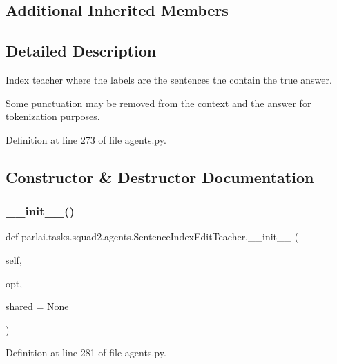 \subsection*{Additional Inherited Members}


\subsection{Detailed Description}
\begin{DoxyVerb}Index teacher where the labels are the sentences the contain the true answer.

Some punctuation may be removed from the context and the answer for tokenization
purposes.
\end{DoxyVerb}
 

Definition at line 273 of file agents.\+py.



\subsection{Constructor \& Destructor Documentation}
\mbox{\label{classparlai_1_1tasks_1_1squad2_1_1agents_1_1SentenceIndexEditTeacher_a7edf449f03ad58cfa58b856b7ada36b5}} 
\subsubsection{\texorpdfstring{\+\_\+\+\_\+init\+\_\+\+\_\+()}{\_\_init\_\_()}}
{\footnotesize\ttfamily def parlai.\+tasks.\+squad2.\+agents.\+Sentence\+Index\+Edit\+Teacher.\+\_\+\+\_\+init\+\_\+\+\_\+ (\begin{DoxyParamCaption}\item[{}]{self,  }\item[{}]{opt,  }\item[{}]{shared = {\ttfamily None} }\end{DoxyParamCaption})}



Definition at line 281 of file agents.\+py.


